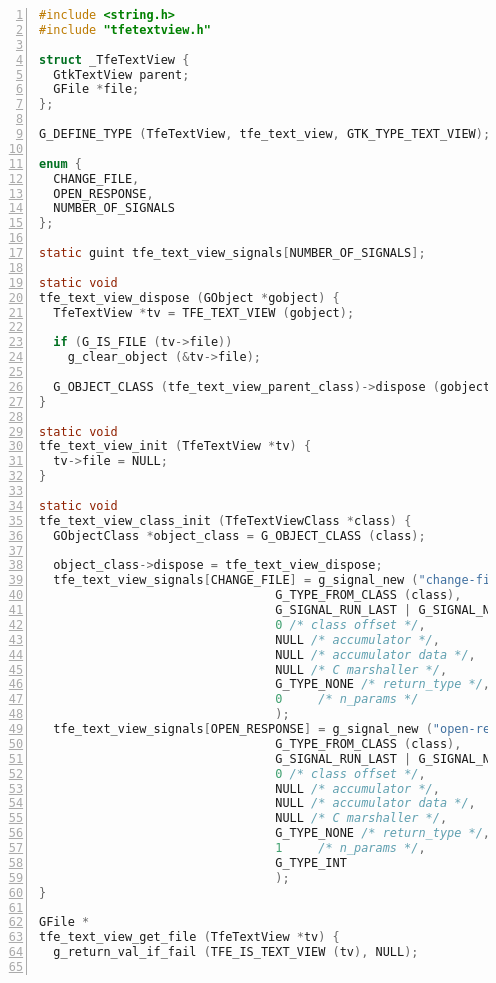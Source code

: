\begin{lstlisting}[language=C, numbers=left]
#include <string.h>
#include "tfetextview.h"

struct _TfeTextView {
  GtkTextView parent;
  GFile *file;
};

G_DEFINE_TYPE (TfeTextView, tfe_text_view, GTK_TYPE_TEXT_VIEW);

enum {
  CHANGE_FILE,
  OPEN_RESPONSE,
  NUMBER_OF_SIGNALS
};

static guint tfe_text_view_signals[NUMBER_OF_SIGNALS];

static void
tfe_text_view_dispose (GObject *gobject) {
  TfeTextView *tv = TFE_TEXT_VIEW (gobject);

  if (G_IS_FILE (tv->file))
    g_clear_object (&tv->file);

  G_OBJECT_CLASS (tfe_text_view_parent_class)->dispose (gobject);
}

static void
tfe_text_view_init (TfeTextView *tv) {
  tv->file = NULL;
}

static void
tfe_text_view_class_init (TfeTextViewClass *class) {
  GObjectClass *object_class = G_OBJECT_CLASS (class);

  object_class->dispose = tfe_text_view_dispose;
  tfe_text_view_signals[CHANGE_FILE] = g_signal_new ("change-file",
                                 G_TYPE_FROM_CLASS (class),
                                 G_SIGNAL_RUN_LAST | G_SIGNAL_NO_RECURSE | G_SIGNAL_NO_HOOKS,
                                 0 /* class offset */,
                                 NULL /* accumulator */,
                                 NULL /* accumulator data */,
                                 NULL /* C marshaller */,
                                 G_TYPE_NONE /* return_type */,
                                 0     /* n_params */
                                 );
  tfe_text_view_signals[OPEN_RESPONSE] = g_signal_new ("open-response",
                                 G_TYPE_FROM_CLASS (class),
                                 G_SIGNAL_RUN_LAST | G_SIGNAL_NO_RECURSE | G_SIGNAL_NO_HOOKS,
                                 0 /* class offset */,
                                 NULL /* accumulator */,
                                 NULL /* accumulator data */,
                                 NULL /* C marshaller */,
                                 G_TYPE_NONE /* return_type */,
                                 1     /* n_params */,
                                 G_TYPE_INT
                                 );
}

GFile *
tfe_text_view_get_file (TfeTextView *tv) {
  g_return_val_if_fail (TFE_IS_TEXT_VIEW (tv), NULL);


\end{lstlisting}
